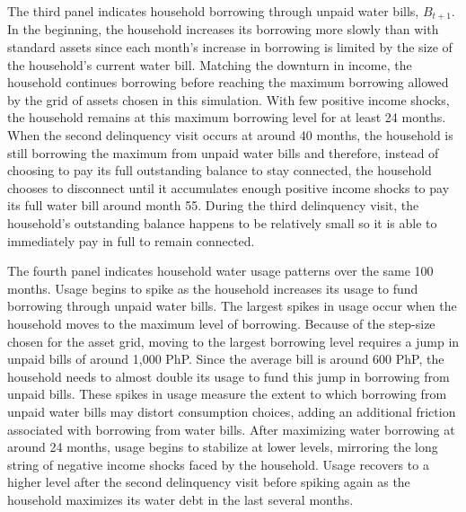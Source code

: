\documentclass[12pt]{article}
\begin{document}
The third panel indicates household borrowing through unpaid water bills, $B_{t+1}$.  In the beginning, the household increases its borrowing more slowly than with standard assets since each month's increase in borrowing is limited by the size of the household's current water bill.  Matching the downturn in income, the household continues borrowing before reaching the maximum borrowing allowed by the grid of assets chosen in this simulation.  With few positive income shocks, the household remains at this maximum borrowing level for at least 24 months.  When the second delinquency visit occurs at around 40 months, the household is still borrowing the maximum from unpaid water bills and therefore, instead of choosing to pay its full outstanding balance to stay connected, the household chooses to disconnect until it accumulates enough positive income shocks to pay its full water bill around month 55.  During the third delinquency visit, the household's outstanding balance happens to be relatively small so it is able to immediately pay in full to remain connected.

The fourth panel indicates household water usage patterns over the same 100 months.  Usage begins to spike as the household increases its usage to fund borrowing through unpaid water bills.  The largest spikes in usage occur when the household moves to the maximum level of borrowing.  Because of the step-size chosen for the asset grid, moving to the largest borrowing level requires a jump in unpaid bills of around 1,000 PhP.  Since the average bill is around 600 PhP, the household needs to almost double its usage to fund this jump in borrowing from unpaid bills.  These spikes in usage measure the extent to which borrowing from unpaid water bills may distort consumption choices, adding an additional friction associated with borrowing from water bills.  After maximizing water borrowing at around 24 months, usage begins to stabilize at lower levels, mirroring the long string of negative income shocks faced by the household.  Usage recovers to a higher level after the second delinquency visit before spiking again as the household maximizes its water debt in the last several months.
\end{document}
